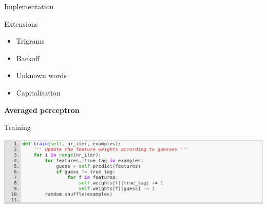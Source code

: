 \documentclass{beamer}
\begin{document}
\begin{frame}{Implementation}


\end{frame}

\begin{frame}{Extensions}

\begin{itemize}
  \item Trigrams
  \item Backoff 
  \item Unknown words
  \item Capitalisation
\end{itemize}


\end{frame}


\begin{frame}
\centering
{\LARGE {\bf Averaged perceptron} }
\end{frame}

\begin{frame}

\end{frame}

\begin{frame}{Training}

\begin{center}
\includegraphics[width=\textwidth]{images/perceptron-train.png}
\end{center}



\end{frame}
\end{document}
